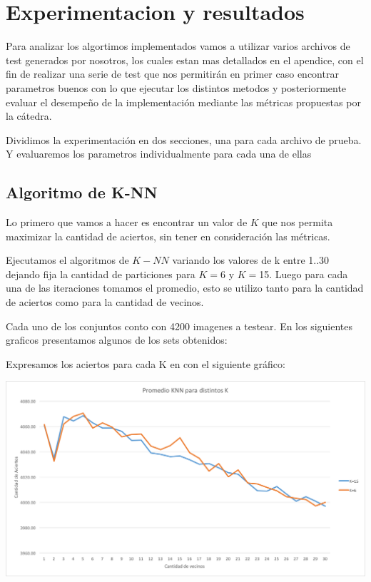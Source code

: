 \section{Experimentacion y resultados}

Para analizar los algortimos implementados vamos a utilizar varios archivos de test generados por nosotros, los cuales estan mas detallados en el apendice, con el fin de realizar una serie de test que nos permitirán en primer caso encontrar parametros buenos con lo que ejecutar los distintos metodos y posteriormente evaluar el desempeño de la implementación mediante las métricas propuestas por la cátedra.

Dividimos la experimentación en dos secciones, una para cada archivo de prueba. Y evaluaremos los parametros individualmente para cada una de ellas

\subsection {Algoritmo de K-NN}

Lo primero que vamos a hacer es encontrar un valor de $K$ que nos permita maximizar la cantidad de aciertos, sin tener en consideración las métricas.

Ejecutamos el algoritmos de $K-NN$ variando los valores de k entre {1..30} dejando fija la cantidad de particiones para $K=$6 y $K=$15. Luego para cada una de las iteraciones tomamos el promedio, esto se utilizo tanto para la cantidad de aciertos como para la cantidad de vecinos.

Cada uno de los conjuntos conto con 4200 imagenes a testear. En los siguientes graficos presentamos algunos de los sets obtenidos:

Expresamos los aciertos para cada K en con el siguiente gráfico:
\begin{center}
\includegraphics[scale=0.6]{imagenes/AciertosKNN.png}
\end{center}

